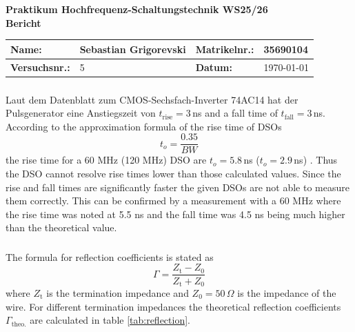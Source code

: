 \documentclass[a4paper,12pt]{article}
\begin{document}
	
	\begin{center}
		{\LARGE \textbf{Praktikum Hochfrequenz-Schaltungstechnik WS25/26}} \\[1em]
		{\large  \textbf{Bericht}} \\[0.5em]
	\end{center}
	
\begin{center}
	\begin{tabular}{|l|p{4cm}|l|p{4cm}|}
		\hline
		\textbf{Name:} &  Sebastian Grigorevski & \textbf{Matrikelnr.:} &  35690104 \\
		\hline
		\textbf{Versuchsnr.:} & 5 & \textbf{Datum:} & \today \\
		\hline
	\end{tabular}
\end{center}
	
	\vspace{1cm}
	\setcounter{section}{5}  %
	\setcounter{subsection}{5}  %
	\setcounter{subsubsection}{0}  %

	\subsubsection{}
	
	Laut dem Datenblatt zum CMOS-Sechsfach-Inverter 74AC14 \cite{bangert} hat der Pulsgenerator eine Anstiegszeit von $t_\mathrm{rise} = 3\,$ns and a fall time of $t_\mathrm{fall} = 3\,$ns. According to the approximation formula of the rise time of DSOs 
	\[
	t_o = \frac{0.35}{BW} 
	\]
	the rise time for a 60 MHz (120 MHz) DSO are $t_o = 5.8\,$ns ($t_o = 2.9\,$ns) \cite{bangert}. Thus the DSO cannot resolve rise times lower than those calculated values. Since the rise and fall times are significantly faster the given DSOs are not able to measure them correctly. This can be confirmed by a measurement with a 60 MHz where the rise time was noted at 5.5 ns and the fall time was 4.5 ns being much higher than the theoretical value.
	
	\subsubsection{}
	The formula for reflection coefficients is stated as	
	\[
	\Gamma = \frac{Z_\mathrm{t} - Z_0}{Z_\mathrm{t} + Z_0}
	\]	
	where $Z_\mathrm{t}$ is the termination impedance and $Z_0 = 50\,\Omega$ is the impedance of the wire. For different termination impedances the theoretical reflection coefficients $\Gamma_\mathrm{theo.}$ are calculated in table \ref{tab:reflection}. 
	
\end{document}
